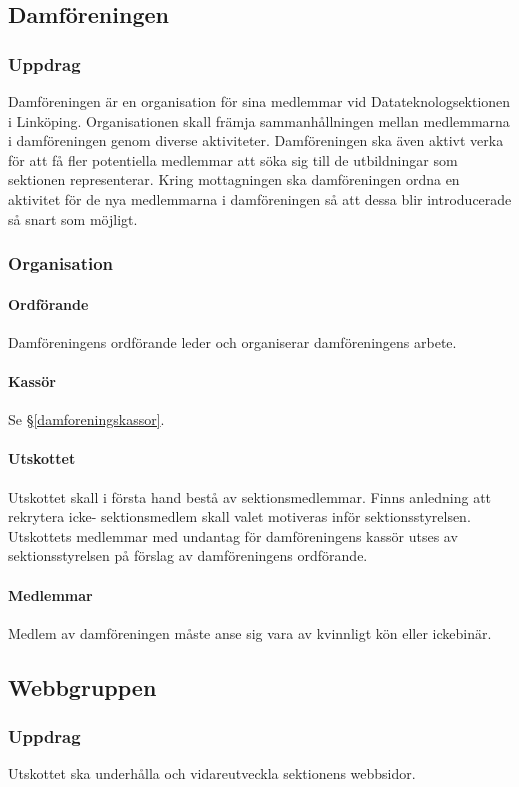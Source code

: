 \documentclass{datateknologsektionen-document}
\begin{document}
\subsection{Damföreningen}
\label{damforeningen}

\subsubsection{Uppdrag}
Damföreningen är en organisation för sina medlemmar vid Datateknologsektionen i Linköping.
Organisationen skall främja sammanhållningen mellan medlemmarna i damföreningen genom
diverse aktiviteter. Damföreningen ska även aktivt verka för att få fler potentiella medlemmar
att söka sig till de utbildningar som sektionen representerar. Kring mottagningen ska damföreningen ordna en aktivitet för de nya medlemmarna i damföreningen så att dessa blir introducerade så snart som möjligt.

\subsubsection{Organisation}
\paragraph{Ordförande}
Damföreningens ordförande leder och organiserar damföreningens arbete.
\paragraph{Kassör}
Se \S \ref{damforeningskassor}.
\paragraph{Utskottet}
Utskottet skall i första hand bestå av sektionsmedlemmar. Finns anledning att rekrytera icke-
sektionsmedlem skall valet motiveras inför sektionsstyrelsen. Utskottets medlemmar med 
undantag för damföreningens kassör utses av sektionsstyrelsen på förslag av damföreningens
ordförande.
\paragraph{Medlemmar}
Medlem av damföreningen måste anse sig vara av kvinnligt kön eller ickebinär.

\subsection{Webbgruppen}
\label{webb}
\subsubsection{Uppdrag}
Utskottet ska underhålla och vidareutveckla sektionens webbsidor.
\end{document}

